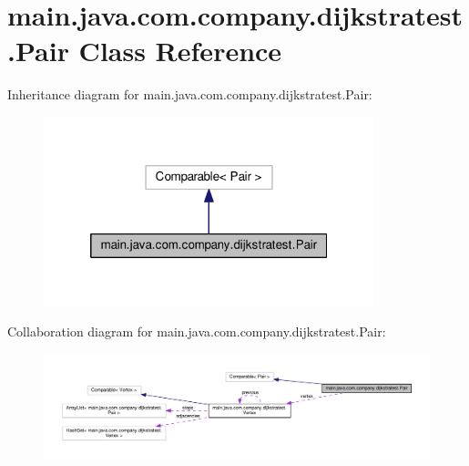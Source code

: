 \hypertarget{classmain_1_1java_1_1com_1_1company_1_1dijkstratest_1_1_pair}{\section{main.\-java.\-com.\-company.\-dijkstratest.\-Pair Class Reference}
\label{classmain_1_1java_1_1com_1_1company_1_1dijkstratest_1_1_pair}
}


Inheritance diagram for main.\-java.\-com.\-company.\-dijkstratest.\-Pair\-:
\nopagebreak
\begin{figure}[H]
\begin{center}
\leavevmode
\includegraphics[width=272pt]{classmain_1_1java_1_1com_1_1company_1_1dijkstratest_1_1_pair__inherit__graph}
\end{center}
\end{figure}


Collaboration diagram for main.\-java.\-com.\-company.\-dijkstratest.\-Pair\-:
\nopagebreak
\begin{figure}[H]
\begin{center}
\leavevmode
\includegraphics[width=350pt]{classmain_1_1java_1_1com_1_1company_1_1dijkstratest_1_1_pair__coll__graph}
\end{center}
\end{figure}
